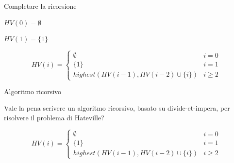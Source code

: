 \begin{frame}{Completare la ricorsione}

\pause
\BIL
\item $HV(0) = \emptyset$
\item $HV(1) = \{ 1 \}$
\EIL

\[
HV(i) = \begin{cases}
  \emptyset & i=0 \\
  \{ 1 \} & i=1 \\
  \mathit{highest}(HV(i-1), HV(i-2) \cup \{ i \}) & i \geq 2
  \end{cases}
\]

\end{frame}

\begin{frame}{Algoritmo ricorsivo}


Vale la pena scrivere un algoritmo ricorsivo, basato su divide-et-impera,
per risolvere il problema di Hateville?

\bigskip
\begin{overprint}
\[
HV(i) = \begin{cases}
  \emptyset & i=0 \\
  \{ 1 \} & i=1 \\
  \mathit{highest}(HV(i-1), HV(i-2) \cup \{ i \}) & i \geq 2
  \end{cases}
\]
\end{overprint}

\end{frame}

